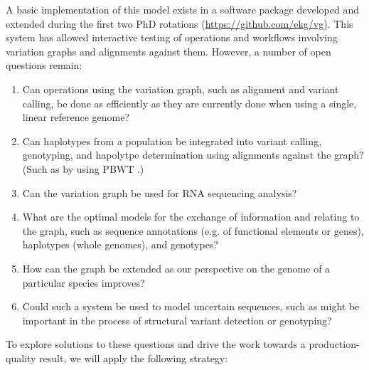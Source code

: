 \documentclass{article}
\begin{document}
A basic implementation of this model exists in a software package developed and extended during the first two PhD rotations (\url{https://github.com/ekg/vg}). This system has allowed interactive testing of operations and workflows involving variation graphs and alignments against them. However, a number of open questions remain:

\begin{enumerate}
  \item Can operations using the variation graph, such as alignment and variant calling, be done as efficiently as they are currently done when using a single, linear reference genome?
  \item Can haplotypes from a population be integrated into variant calling, genotyping, and hapolytpe determination using alignments against the graph? (Such as by using PBWT \cite{durbin2014pbwt}.)
  \item Can the variation graph be used for RNA sequencing analysis?
  \item What are the optimal models for the exchange of information and relating to the graph, such as sequence annotations (e.g. of functional elements or genes), haplotypes (whole genomes), and genotypes?
  \item How can the graph be extended as our perspective on the genome of a particular species improves?
  \item Could such a system be used to model uncertain sequences, such as might be important in the process of structural variant detection or genotyping?
\end{enumerate}

To explore solutions to these questions and drive the work towards a production-quality result, we will apply the following strategy:


{}


\end{document}
